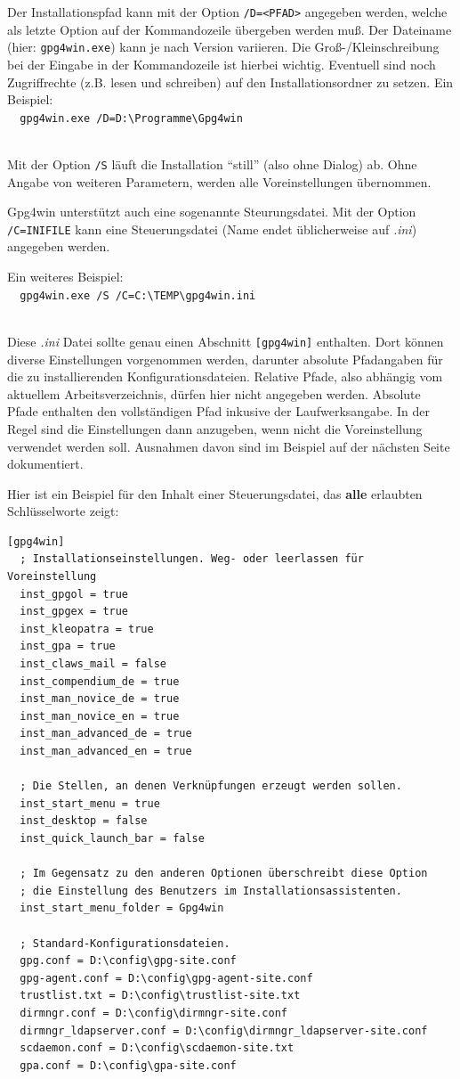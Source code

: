 \documentclass[a4paper,11pt, oneside,openright,titlepage,dvips]{scrbook}
\begin{document}
Der Installationspfad kann mit der Option \verb-/D=<PFAD>- angegeben
werden, welche als letzte Option auf der Kommandozeile übergeben
werden muß.
Der Dateiname (hier: \verb-gpg4win.exe-) kann je nach Version variieren.
Die Groß-/Kleinschreibung bei der Eingabe in der
Kommandozeile ist hierbei wichtig. Eventuell sind noch Zugriffrechte
(z.B. lesen und schreiben) auf den Installationsordner zu setzen.
Ein Beispiel:\\
\verb-  gpg4win.exe /D=D:\Programme\Gpg4win-

~\\Mit der Option \verb-/S- läuft die Installation "`still"' (also
ohne Dialog) ab. Ohne Angabe von weiteren
Parametern, werden alle Voreinstellungen übernommen.

Gpg4win unterstützt auch eine sogenannte Steurungsdatei.
Mit der Option \verb-/C=INIFILE- kann eine Steuerungsdatei (Name endet
üblicherweise auf \textit{.ini}) angegeben werden. 

Ein weiteres Beispiel:\\
\verb-  gpg4win.exe /S /C=C:\TEMP\gpg4win.ini-

~\\Diese \textit{.ini} Datei sollte genau einen Abschnitt \verb-[gpg4win]- enthalten.
Dort können diverse Einstellungen vorgenommen werden, darunter
absolute Pfadangaben für die zu installierenden Konfigurationsdateien.
Relative Pfade, also abhängig vom aktuellem
Arbeitsverzeichnis, dürfen hier nicht angegeben werden. Absolute Pfade
enthalten den vollständigen Pfad inkusive der Laufwerksangabe.
In der Regel sind die Einstellungen dann anzugeben, wenn nicht
die Voreinstellung verwendet werden soll.
Ausnahmen davon sind im Beispiel auf der nächsten Seite dokumentiert.

\clearpage
Hier ist ein Beispiel für den Inhalt einer Steuerungsdatei, das 
\textbf{alle} erlaubten Schlüsselworte zeigt:

\begin{verbatim}
[gpg4win]
  ; Installationseinstellungen. Weg- oder leerlassen für Voreinstellung
  inst_gpgol = true
  inst_gpgex = true
  inst_kleopatra = true
  inst_gpa = true
  inst_claws_mail = false
  inst_compendium_de = true
  inst_man_novice_de = true
  inst_man_novice_en = true
  inst_man_advanced_de = true
  inst_man_advanced_en = true

  ; Die Stellen, an denen Verknüpfungen erzeugt werden sollen.
  inst_start_menu = true
  inst_desktop = false
  inst_quick_launch_bar = false

  ; Im Gegensatz zu den anderen Optionen überschreibt diese Option
  ; die Einstellung des Benutzers im Installationsassistenten.
  inst_start_menu_folder = Gpg4win

  ; Standard-Konfigurationsdateien.
  gpg.conf = D:\config\gpg-site.conf
  gpg-agent.conf = D:\config\gpg-agent-site.conf
  trustlist.txt = D:\config\trustlist-site.txt
  dirmngr.conf = D:\config\dirmngr-site.conf
  dirmngr_ldapserver.conf = D:\config\dirmngr_ldapserver-site.conf
  scdaemon.conf = D:\config\scdaemon-site.txt
  gpa.conf = D:\config\gpa-site.conf
\end{verbatim}
\end{document}

